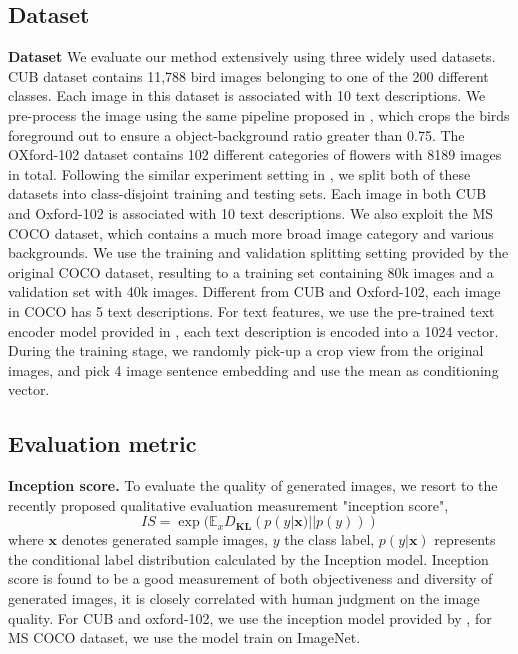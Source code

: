 \documentclass[10pt,twocolumn,letterpaper]{article}
\begin{document}
\subsection{Dataset}
\textbf{Dataset} 
We evaluate our method extensively using three widely used datasets.  CUB dataset contains 11,788 bird images belonging to one of the 200 different classes. Each image in this dataset is associated with 10 text descriptions. We pre-process the image using the same pipeline proposed in \cite{han2017stackgan}, which crops the birds foreground out to  ensure a object-background ratio greater than 0.75.  The OXford-102 dataset contains 102 different categories of flowers with 8189 images in total. Following the similar experiment setting in \cite{han2017stackgan, reed2016generative}, we split both of these datasets into class-disjoint training and testing sets. Each image in both CUB and Oxford-102 is associated with 10 text descriptions. We also exploit the MS  COCO dataset, which contains a much more broad image category and various backgrounds. We use the training and validation splitting setting provided by the original COCO dataset, resulting to a training set containing 80k images and a validation set with 40k images.  Different from CUB and Oxford-102, each image in COCO has 5 text descriptions. 
For text features, we use the pre-trained text encoder model provided in \cite{reed2016generative}, each text description is encoded into a 1024 vector.
During the training stage, we randomly pick-up a crop view from the original images, and pick 4 image sentence embedding and use the mean as conditioning vector.


\subsection{Evaluation metric}
\textbf{Inception score. }  To evaluate the quality of generated images, we resort to the recently proposed qualitative evaluation measurement "inception score"\cite{improvedGAN},
 \begin{equation}
	IS = \exp(\mathbb{E}_xD_{\bm{KL}}(p(y|\bm{x})||p(y)))
 \end{equation}
 where $\bm{x}$ denotes generated sample images, $y$ the class label, $p(y|\bm{x})$ represents the conditional label distribution calculated by the Inception model\cite{inception}. Inception score is found to be a good measurement of both objectiveness and diversity of generated images, it is closely correlated with human judgment on the image quality.  For CUB and oxford-102, we use the inception model provided by \cite{han2017stackgan}, for MS COCO dataset, we use the model train on ImageNet.
 
\end{document}
